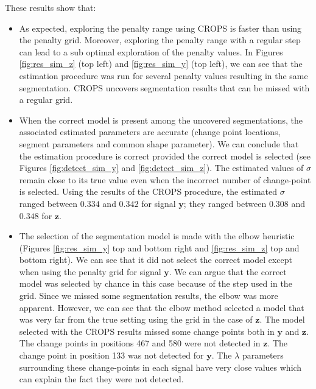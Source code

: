 These results show that:
\begin{itemize}
\item As expected, exploring the penalty range using CROPS is faster than using the penalty grid. Moreover, exploring the penalty range with a regular step can lead to a sub optimal exploration of the penalty values. In Figures \ref{fig:res_sim_z} (top left) and \ref{fig:res_sim_y} (top left), we can see that the estimation procedure was run for several penalty values resulting in the same segmentation. CROPS uncovers segmentation results that can be missed with a regular grid.%
\item When the correct model is present among the uncovered segmentations, the associated estimated parameters are accurate (change point locations, segment parameters and common shape parameter). We can conclude that the estimation procedure is correct provided the correct model is selected (see Figures \ref{fig:detect_sim_y} and \ref{fig:detect_sim_z}). The estimated values of $\sigma$ remain close to its true value even when the incorrect number of change-point is selected. Using the results of the CROPS procedure, the estimated $\sigma$ ranged between $0.334$ and $0.342$ for signal $\bm y$; they ranged between $0.308$ and $ 0.348$ for $\bm z$. 

\item The selection of the segmentation model is made with the elbow heuristic (Figures \ref{fig:res_sim_y} top and bottom right and \ref{fig:res_sim_z} top and bottom right). We can see that it did not select the correct model except when using the penalty grid for signal $\bm y$. We can argue that the correct model was selected by chance in this case because of the step used in the grid. Since we missed some segmentation results, the elbow was more apparent. However, we can see that the elbow method selected a model that was very far from the true setting using the grid in the case of $\bm z$. The model selected with the CROPS results missed some change points both in $\bm y$ and $\bm z$. The change points in positions 467 and 580 were not detected in $\bm z$. The change point in position 133 was not detected for $\bm y$. The $\lambda$ parameters surrounding these change-points in each signal have very close values which can explain the fact they were not detected.     
\end{itemize}

